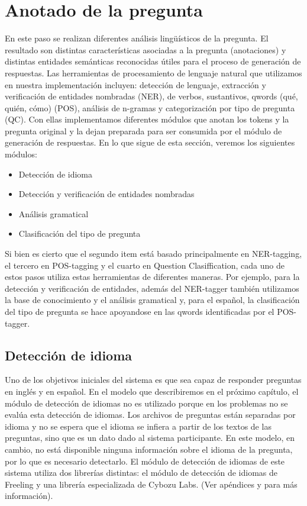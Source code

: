 \section{Anotado de la pregunta}
\label{sec:qp-mitic}


En este paso se realizan diferentes análisis lingüísticos de la pregunta. El resultado son distintas características asociadas a la pregunta (anotaciones) y distintas entidades semánticas reconocidas útiles para el proceso de generación de respuestas. 
Las herramientas de procesamiento de lenguaje natural que utilizamos en nuestra implementación incluyen: detección de lenguaje, extracción y verificación de entidades nombradas (NER), de verbos, sustantivos, qwords (qué, quién, cómo) (POS), análisis de n-gramas y categorización por tipo de pregunta (QC).
Con ellas implementamos diferentes módulos que anotan los tokens y la pregunta original y la dejan preparada para ser consumida por el módulo de generación de respuestas. En lo que sigue de esta sección, veremos los siguientes módulos:

\begin{itemize}
\item Detección de idioma 
\item Detección y verificación de entidades nombradas
\item Análisis gramatical
\item Clasificación del tipo de pregunta
\end{itemize}

Si bien es cierto que el segundo item está basado principalmente en NER-tagging, el tercero en POS-tagging y el cuarto en Question Clasiffication, 
cada uno de estos pasos utiliza estas herramientas de diferentes maneras. Por ejemplo, para la detección y verificación de entidades, además del NER-tagger también utilizamos la base de conocimiento y el análisis gramatical y, para el español, la clasificación del tipo de pregunta se hace apoyandose en las qwords identificadas por el POS-tagger.

\subsection{Detección de idioma}

Uno de los objetivos iniciales del sistema es que sea capaz de responder preguntas en inglés y en español. En el modelo que describiremos en el próximo capítulo, el módulo de detección de idiomas no es utilizado porque en los problemas no se evalúa esta detección de idiomas. Los archivos de preguntas están separadas por idioma y no se espera que el idioma se infiera a partir de los textos de las preguntas, sino que es un dato dado al sistema participante. En este modelo, en cambio, no está disponible ninguna información sobre el idioma de la pregunta, por lo que es necesario detectarlo. El módulo de detección de idiomas de este sistema utiliza dos librerías distintas: el módulo de detección de idiomas de Freeling y una librería especializada de Cybozu Labs. (Ver apéndices  y  para más información).

